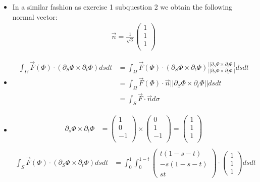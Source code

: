 \documentclass[11pt]{article}
\begin{document}
\begin{solution}     
    \begin{itemize}
    \item  In a similar fashion as exercise 1 subquestion 2 we obtain the following normal vector:
	\begin{align*}
		\vec{n} = \frac{1}{\sqrt{3}} \begin{pmatrix}1\\1\\1\\\end{pmatrix}
	\end{align*}
    \item
	\begin{align*}
        \int_{\Omega} \vec{F}(\Phi) \cdot  ( \partial_S \Phi \times \partial_t \Phi ) dsdt &=\int_{\Omega} \vec{F}(\Phi) \cdot  ( \partial_S \Phi \times \partial_t \Phi )\frac{||\partial_S \Phi \times \partial_t \Phi ||}{||\partial_S \Phi \times \partial_t \Phi ||} dsdt \\
        &=\int_{\Omega} \vec{F}(\Phi) \cdot \vec{n}||\partial_S \Phi \times \partial_t \Phi || dsdt \\
        &=\int_S \vec{F}\cdot \vec{n} d\sigma
	\end{align*}
    \item
	\begin{align*}
        \partial_s\Phi\times\partial_t\Phi &= \begin{pmatrix}1\\0\\-1\\\end{pmatrix}\times\begin{pmatrix}0\\1\\-1\\\end{pmatrix} = \begin{pmatrix}1\\1\\1\\\end{pmatrix}\\
    \end{align*}
	\begin{align*}
        \int_S \vec{F}(\Phi) \cdot  ( \partial_S \Phi \times \partial_t \Phi ) dsdt &= \int_0^1 \int_0^{1-t} \begin{pmatrix}t(1-s-t)\\-s(1-s-t)\\st\end{pmatrix}\cdot  \begin{pmatrix}1\\1\\1\end{pmatrix} ds dt\\

\end{align*}
\end{itemize}
\end{solution}
\end{document}
